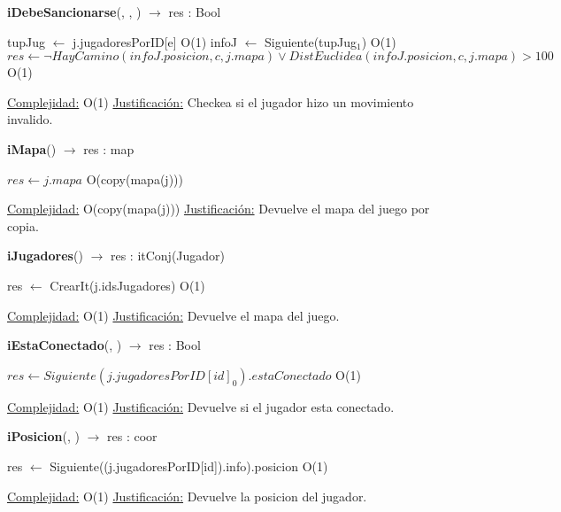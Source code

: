 \begin{algorithm}[H]{\textbf{iDebeSancionarse}(, , ) $\to$ res : Bool} 
	\begin{algorithmic}
    \State tupJug $\gets$ j.jugadoresPorID[e]	\Comment O(1)
  	\State infoJ $\gets$ Siguiente(tupJug$_{1}$)	\Comment O(1)
		\State $res \gets \neg HayCamino(infoJ.posicion, c, j.mapa) \lor DistEuclidea(infoJ.posicion, c, j.mapa) > 100 $ \Comment O(1)
	
		\medskip
		\Statex \underline{Complejidad:} O(1)
		\Statex \underline{Justificación:} Checkea si el jugador hizo un movimiento invalido.
    \end{algorithmic}
\end{algorithm}

\begin{algorithm}[H]{\textbf{iMapa}() $\to$ res : map} 
	{}
	\begin{algorithmic}
		\State $res \gets j.mapa $ \Comment O(copy(mapa(j)))
	
		\medskip
		\Statex \underline{Complejidad:} O(copy(mapa(j)))
		\Statex \underline{Justificación:} Devuelve el mapa del juego por copia.
    \end{algorithmic}
\end{algorithm}

\begin{algorithm}[H]{\textbf{iJugadores}() $\to$ res : itConj(Jugador)} 
	{}
	\begin{algorithmic}
		\State res $\gets$ CrearIt(j.idsJugadores)	\Comment O(1)
	
		\medskip
		\Statex \underline{Complejidad:} O(1)
		\Statex \underline{Justificación:} Devuelve el mapa del juego.
    \end{algorithmic}
\end{algorithm}

\begin{algorithm}[H]{\textbf{iEstaConectado}(, ) $\to$ res : Bool} 
	{}
	\begin{algorithmic}
		\State $res \gets Siguiente(j.jugadoresPorID[id]_0).estaConectado $ \Comment O(1)
	
		\medskip
		\Statex \underline{Complejidad:} O(1)
		\Statex \underline{Justificación:} Devuelve si el jugador esta conectado.
    \end{algorithmic}
\end{algorithm}

\begin{algorithm}[H]{\textbf{iPosicion}(, ) $\to$ res : coor} 
	{}
	\begin{algorithmic}
		\State res $\gets$ Siguiente((j.jugadoresPorID[id]).info).posicion  \Comment O(1)
	
		\medskip
		\Statex \underline{Complejidad:} O(1)
		\Statex \underline{Justificación:} Devuelve la posicion del jugador.
    \end{algorithmic}
\end{algorithm}

